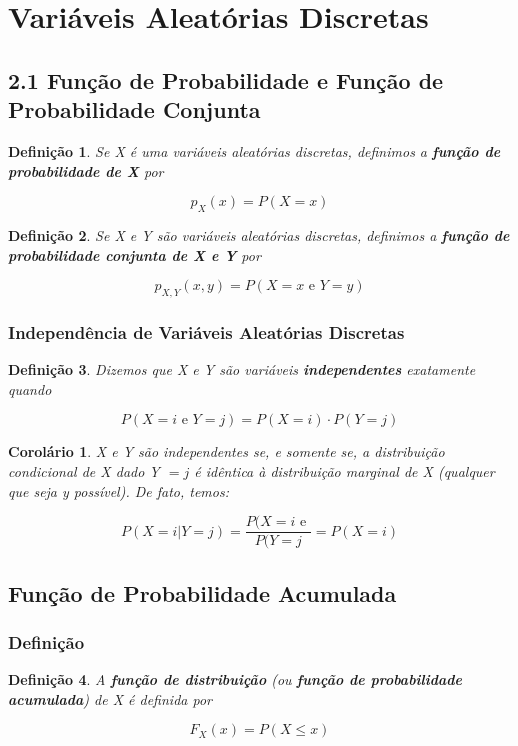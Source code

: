 \documentclass[12pt]{article}
\newtheorem{corollary}{Corolário}[theorem]
\newtheorem{definition}{Definição}
\begin{document}
\section{Variáveis Aleatórias Discretas}
\subsection*{2.1 Função de Probabilidade e Função de Probabilidade Conjunta}
\begin{definition}
Se X é uma variáveis aleatórias discretas, definimos a \textbf{função de probabilidade de X} por

$$p_{X} (x) = P(X = x)$$
\end{definition}

\begin{definition}
Se X e Y são variáveis aleatórias discretas, definimos a \textbf{função de probabilidade conjunta de X e Y} por

$$p_{X, Y} (x, y) = P(X = x \text{ e } Y = y)$$
\end{definition}

\subsubsection*{Independência de Variáveis Aleatórias Discretas}
\begin{definition}
Dizemos que X e Y são variáveis \textbf{independentes} exatamente quando

$$P(X = i \text{ e } Y = j) = P(X = i) \cdot P(Y = j)$$
\end{definition}

\begin{corollary}
X e Y são independentes se, e somente se, a distribuição condicional de X dado Y $= j$ é idêntica à distribuição marginal de X (qualquer que seja y possível). De fato, temos:

$$P(X = i | Y = j) = \dfrac{P(X = i \text{ e }}{P(Y = j} = P(X = i)$$
\end{corollary}

\subsection*{Função de Probabilidade Acumulada}
\subsubsection*{Definição}
\begin{definition}
A \textbf{função de distribuição} (ou \textbf{função de probabilidade acumulada}) de X é definida por

$$F_X(x) = P(X \leq x)$$
\end{definition}
\end{document}
